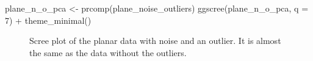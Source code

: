 \documentclass[
  letterpaper,
]{krantz}
\newenvironment{Shaded}{\begin{snugshade}}{\end{snugshade}}
\newcommand{\AttributeTok}[1]{\textcolor[rgb]{0.40,0.45,0.13}{#1}}
\newcommand{\DecValTok}[1]{\textcolor[rgb]{0.68,0.00,0.00}{#1}}
\newcommand{\FunctionTok}[1]{\textcolor[rgb]{0.28,0.35,0.67}{#1}}
\newcommand{\NormalTok}[1]{\textcolor[rgb]{0.00,0.23,0.31}{#1}}
\newcommand{\OtherTok}[1]{\textcolor[rgb]{0.00,0.23,0.31}{#1}}
\newcommand{\SpecialCharTok}[1]{\textcolor[rgb]{0.37,0.37,0.37}{#1}}
\begin{document}
\begin{Shaded}
\begin{Highlighting}[]
\NormalTok{plane\_n\_o\_pca }\OtherTok{\textless{}{-}} \FunctionTok{prcomp}\NormalTok{(plane\_noise\_outliers)}
\FunctionTok{ggscree}\NormalTok{(plane\_n\_o\_pca, }\AttributeTok{q =} \DecValTok{7}\NormalTok{) }\SpecialCharTok{+} \FunctionTok{theme\_minimal}\NormalTok{()}
\end{Highlighting}
\end{Shaded}

\begin{figure}[H]


\caption{\label{fig-plane-n-o-scree}Scree plot of the planar data with
noise and an outlier. It is almost the same as the data without the
outliers.}

\end{figure}%
\end{document}
